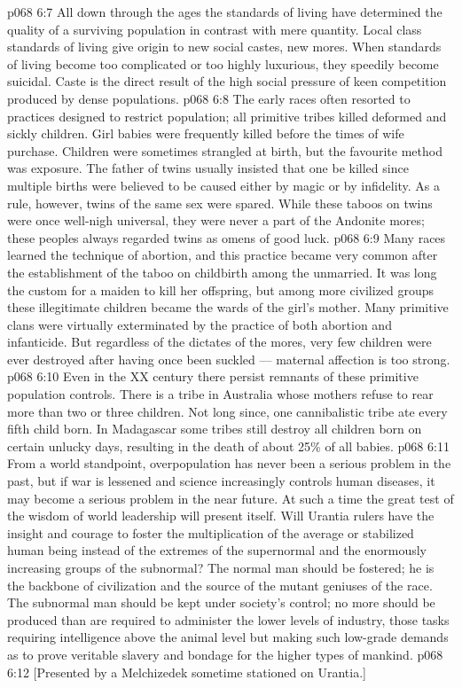 \vs p068 6:7 All down through the ages the standards of living have determined the quality of a surviving population in contrast with mere quantity. Local class standards of living give origin to new social castes, new mores. When standards of living become too complicated or too highly luxurious, they speedily become suicidal. Caste is the direct result of the high social pressure of keen competition produced by dense populations.
\vs p068 6:8 The early races often resorted to practices designed to restrict population; all primitive tribes killed deformed and sickly children. Girl babies were frequently killed before the times of wife purchase. Children were sometimes strangled at birth, but the favourite method was exposure. The father of twins usually insisted that one be killed since multiple births were believed to be caused either by magic or by infidelity. As a rule, however, twins of the same sex were spared. While these taboos on twins were once well\hyp{}nigh universal, they were never a part of the Andonite mores; these peoples always regarded twins as omens of good luck.
\vs p068 6:9 Many races learned the technique of abortion, and this practice became very common after the establishment of the taboo on childbirth among the unmarried. It was long the custom for a maiden to kill her offspring, but among more civilized groups these illegitimate children became the wards of the girl’s mother. Many primitive clans were virtually exterminated by the practice of both abortion and infanticide. But regardless of the dictates of the mores, very few children were ever destroyed after having once been suckled --- maternal affection is too strong.
\vs p068 6:10 Even in the XX century there persist remnants of these primitive population controls. There is a tribe in Australia whose mothers refuse to rear more than two or three children. Not long since, one cannibalistic tribe ate every fifth child born. In Madagascar some tribes still destroy all children born on certain unlucky days, resulting in the death of about 25\% of all babies.
\vs p068 6:11 \pc From a world standpoint, overpopulation has never been a serious problem in the past, but if war is lessened and science increasingly controls human diseases, it may become a serious problem in the near future. At such a time the great test of the wisdom of world leadership will present itself. Will Urantia rulers have the insight and courage to foster the multiplication of the average or stabilized human being instead of the extremes of the supernormal and the enormously increasing groups of the subnormal? The normal man should be fostered; he is the backbone of civilization and the source of the mutant geniuses of the race. The subnormal man should be kept under society’s control; no more should be produced than are required to administer the lower levels of industry, those tasks requiring intelligence above the animal level but making such low\hyp{}grade demands as to prove veritable slavery and bondage for the higher types of mankind.
\vsetoff
\vs p068 6:12 [Presented by a Melchizedek sometime stationed on Urantia.]
\quizlink
